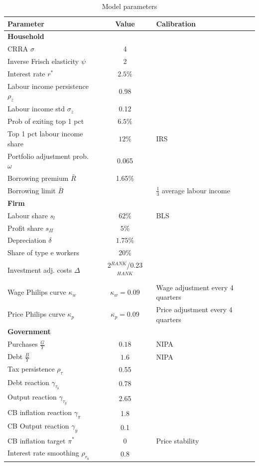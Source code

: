 \documentclass[12pt]{article}
\begin{document}
\begin{table}
\centering
\caption{Model parameters}
\footnotesize
\begin{tabular}{l c l}
Parameter & Value  & Calibration\\\hline
\textbf{Household} \\
CRRA $\sigma$ & 4 & \cite{kaplan2018monetary}\\
Inverse Frisch elasticity $\psi$ & 2 & \cite{chetty2011micro} \\
Interest rate $r^{*}$ & $2.5\%$ & \cite{bayer2020solving} \\
Labour income persistence $\rho_{z}$ & 0.98 & \cite{storesletten2004cyclical} \\
Labour income std  $\sigma_{z}$ & 0.12 & \cite{storesletten2004cyclical} \\
Prob of exiting top 1 pct &$6.5\%$ & \cite{guvenen2014nature} \\
Top 1 pct labour income share & $12\%$ & IRS \\
Portfolio adjustment prob. $\omega$ & 0.065 & \cite{bayer2020shocks}  \\
Borrowing premium $\bar{R}$ & 1.65\% & \cite{bayer2020shocks}\\
Borrowing limit $\bar{B}$ &  & $\frac{1}{3}$ average labour income\\
\textbf{Firm} \\
Labour share $s_l$  & $62\%$  & BLS\\
Profit share $s_\Pi$ & $5\%$  & \\
Depreciation  $\delta$  & $1.75\%$  & \\
Share of type e workers & 20\% & \cite{kaplan2020markups}\\
Investment adj. costs $\Delta$ & 2$^{RANK}$/0.23$^{HANK}$ & \cite{bayer2020solving} \\
Wage Philips curve $\kappa_w$ & $\kappa_w=0.09$ & Wage adjustment every 4 quarters \\
Price Philips curve $\kappa_p$ & $\kappa_p=0.09$ & Price adjustment every 4 quarters\\
\textbf{Government} \\
Purchases $\frac{G}{Y}$ & $0.18$ & NIPA \\
Debt $\frac{B}{Y}$ & $1.6$ & NIPA \\
Tax persistence $\rho_{\tau}$ & 0.55 & \cite{bayer2020shocks}\\
Debt reaction $\gamma_{\tau_b}$ & 0.78 & \cite{bayer2020shocks}\\
Output reaction $\gamma_{\tau_y}$ & 2.65 & \cite{bayer2020shocks} \\
CB inflation reaction $\gamma_\pi$ & 1.8& \\
CB Output reaction $\gamma_y$ & 0.1&\\
CB inflation target $\pi^*$ & 0& Price stability\\
Interest rate smoothing $\rho_{r_b}$ & 0.8 & \cite{bayer2020shocks} \\
\end{tabular}
\label{table:tabparam}
\end{table}
\end{document}
